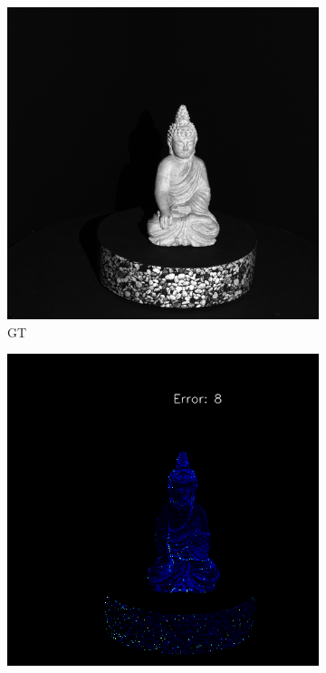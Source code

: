 \begin{figure}[th]
	
	\begin{subfigure}[b]{0.2\linewidth}
		\includegraphics[width=\linewidth]{./Figures/comparison_real/00008.image0.png}
		\caption{GT}
	\end{subfigure}
	\begin{subfigure}[b]{0.2\linewidth}
		\includegraphics[width=\linewidth]{./Figures/comparison_real/fancy_eval_0_error_SVD.png}

\end{subfigure}
\end{figure}
